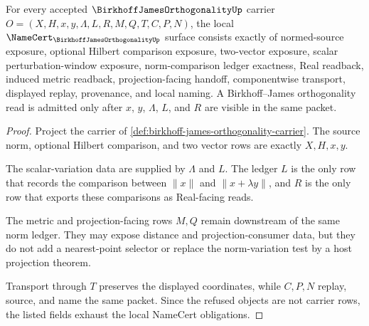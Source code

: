 \begin{theorem}
\label{thm:birkhoff-james-orthogonality-namecert-obligations}
For every accepted $\BirkhoffJamesOrthogonalityUp$ carrier $O=(X,H,x,y,\Lambda,L,R,M,Q,T,C,P,N)$, the local $\NameCert_{\BirkhoffJamesOrthogonalityUp}$ surface consists exactly of normed-source exposure, optional Hilbert comparison exposure, two-vector exposure, scalar perturbation-window exposure, norm-comparison ledger exactness, Real readback, induced metric readback, projection-facing handoff, componentwise transport, displayed replay, provenance, and local naming. A Birkhoff--James orthogonality read is admitted only after $x$, $y$, $\Lambda$, $L$, and $R$ are visible in the same packet.
\end{theorem}
\begin{proof}
Project the carrier of \autoref{def:birkhoff-james-orthogonality-carrier}. The source norm, optional Hilbert comparison, and two vector rows are exactly $X,H,x,y$.

The scalar-variation data are supplied by $\Lambda$ and $L$. The ledger $L$ is the only row that records the comparison between $\|x\|$ and $\|x+\lambda y\|$, and $R$ is the only row that exports these comparisons as Real-facing reads.

The metric and projection-facing rows $M,Q$ remain downstream of the same norm ledger. They may expose distance and projection-consumer data, but they do not add a nearest-point selector or replace the norm-variation test by a host projection theorem.

Transport through $T$ preserves the displayed coordinates, while $C,P,N$ replay, source, and name the same packet. Since the refused objects are not carrier rows, the listed fields exhaust the local NameCert obligations.
\end{proof}

